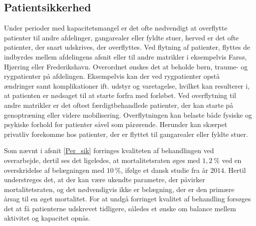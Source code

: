 

\subsection{Patientsikkerhed}
Under perioder med kapacitetsmangel er det ofte nødvendigt at overflytte patienter til andre afdelinger, gangarealer eller fyldte stuer, herved er det ofte patienter, der snart udskrives, der overflyttes. Ved flytning af patienter, flyttes de indbyrdes mellem afdelingens afsnit eller til andre matrikler i eksempelvis Farsø, Hjørring eller Frederikshavn. Overordnet ønskes det at beholde børn, traume- og rygpatienter på afdelingen. Eksempelvis kan der ved rygpatienter opstå ændringer samt komplikationer ift. udstyr og varetagelse, hvilket kan resulterer i, at patienten er nødsaget til at starte forfra med forløbet. Ved overflytning til andre matrikler er det oftest færdigtbehandlede patienter, der kan starte på genoptræning eller videre mobilisering. Overflytningen kan belaste både fysiske og psykiske forhold for patienter såvel som pårørende\cite{Heidmann2014}. Herunder kan skærpet privatliv forekomme hos patienter, der er flyttet til gangarealer eller fyldte stuer\cite{Madsen2014}. 

Som nævnt i afsnit \ref{Per_sik} forringes kvaliteten af behandlingen ved overarbejde, dertil ses det ligeledes, at mortalitetsraten øges med $1,2~\%$ ved en overskridelse af belægningen med $10~\%$, ifølge et dansk studie fra år $2014$\cite{Madsen2014}. Hertil understreges det, at der kan være ukendte parametre, der påvirker mortalitetsraten, og det nødvendigvis ikke er belægning, der er den primære årsag til en øget mortalitet. For at undgå forringet kvalitet af behandling forsøges det at få patienterne udskrevet tidligere, således et ønske om balance mellem aktivitet og kapacitet opnås.

